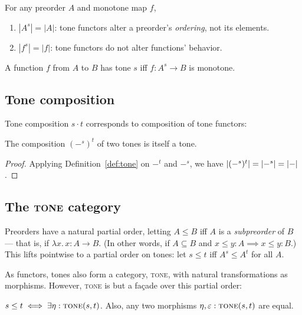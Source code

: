 \documentclass[b5,wide,libertine,ribbons]{rntz}
\newcommand{\fn}{\lambda}
\newcommand{\binder}{.\,}
\newcommand{\bind}[1]{{#1}\binder}
\newcommand{\fnof}[1]{\fn\bind{#1}}
\newcommand{\cat}[1]{\textsc{#1}} %
\newcommand{\Tone}{\cat{tone}}
\newcommand{\Cat}{\cat{cat}}
\newcommand{\tc}{\cdot}                 %
\begin{document}
\begin{corollary}
  For any preorder $A$ and monotone map $f$,
  \begin{enumerate}
  \item $|A^s| = |A|$: tone functors alter a preorder's \emph{ordering}, not its
    elements.
  \item $|f^s| = |f|$: tone functors do not alter functions' behavior.
  \end{enumerate}
\end{corollary}

\begin{definition}
  A function $f$ from $A$ to $B$ has tone $s$ iff $f : A^s \to B$ is monotone.
\end{definition}


\subsection{Tone composition}

Tone composition $s \tc t$ corresponds to composition of tone functors:

\begin{theorem}
  The composition $(-^s)^t$ of two tones is itself a tone.
\end{theorem}

\begin{proof} Applying Definition~\ref{def:tone} on $-^t$ and $-^s$, we have
  \( |{(-^s)^t}| = |{-^s}| = |{-}| \).
\end{proof}


\subsection{The \Tone{} category}

Preorders have a natural partial order, letting $A \le B$ iff $A$ is a
\emph{subpreorder} of $B$ --- that is, if $\fnof{x} x : A \to B$. (In other
words, if $A \subseteq B$ and $x \le y : A \implies x \le y : B$.)
%
This lifts pointwise to a partial order on tones: let $s \le t$ iff $A^s \le
A^t$ for all $A$.

As functors, tones also form a category, \Tone{}, with natural transformations
as morphisms. However, \Tone{} is but a fa\c{c}ade over this partial order:

\begin{theorem}\label{thm:tone-poset}
  $s \le t \iff \exists \eta : \Tone(s, t)$. Also, any two morphisms $\eta,
  \varepsilon : \Tone(s,t)$ are equal.
\end{theorem}
\end{document}
